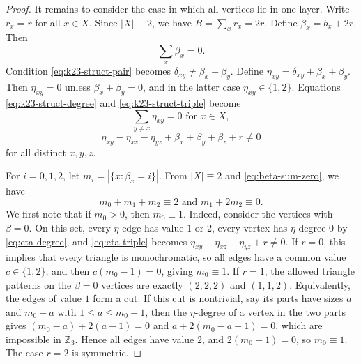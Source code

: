 \documentclass[10pt,a4paper]{amsart}
\newcommand{\Z}{\mathbb Z}
\begin{document}
\begin{proof}
    It remains to consider the case in which all vertices lie in one layer.  Write $r_x=r$ for all $x\in X$.  Since $|X|\equiv2$, we have $B=\sum_xr_x=2r$.  Define $\beta_x=b_x+2r$.  Then
    \begin{equation}\label{eq:beta-sum-zero}
        \sum_x\beta_x=0.
    \end{equation}
    Condition \eqref{eq:k23-struct-pair} becomes $\delta_{xy}\ne\beta_x+\beta_y$.  Define $\eta_{xy}=\delta_{xy}+\beta_x+\beta_y$.  Then $\eta_{xy}=0$ unless $\beta_x+\beta_y=0$, and in the latter case $\eta_{xy}\in\{1,2\}$.  Equations \eqref{eq:k23-struct-degree} and \eqref{eq:k23-struct-triple} become
    \begin{equation}\label{eq:eta-degree}
        \sum_{y\ne x}\eta_{xy}=0\text{ for }x\in X,
    \end{equation}
    \begin{equation}\label{eq:eta-triple}
        \eta_{xy}-\eta_{xz}-\eta_{yz}+\beta_x+\beta_y+\beta_z+r\ne0
    \end{equation}
    for all distinct $x,y,z$.

    For \(i=0,1,2\), let $m_i=|\{x:\beta_x=i\}|$.  From $|X|\equiv2$ and \eqref{eq:beta-sum-zero}, we have
    \begin{equation}\label{eq:mi-basic}
        m_0+m_1+m_2\equiv2\text{ and }m_1+2m_2\equiv0.
    \end{equation}
    We first note that if \(m_0>0\), then
    \(m_0\equiv 1.\)
    Indeed, consider the vertices with \(\beta=0\). On this set, every \(\eta\)-edge has value \(1\) or \(2\), every vertex has \(\eta\)-degree \(0\) by \eqref{eq:eta-degree}, and \eqref{eq:eta-triple} becomes
    \(\eta_{xy}-\eta_{xz}-\eta_{yz}+r\ne 0.\)
    If \(r=0\), this implies that every triangle is monochromatic, so all edges have a common value \(c\in\{1,2\}\), and then \(c(m_0-1)=0\), giving \(m_0\equiv 1\). If \(r=1\), the allowed triangle patterns on the \(\beta=0\) vertices are exactly \((2,2,2)\) and \((1,1,2)\). Equivalently, the edges of value \(1\) form a cut. If this cut is nontrivial, say its parts have sizes $a$ and $m_0-a$ with $1\le a\le m_0-1$, then the \(\eta\)-degree of a vertex in the two parts gives $(m_0-a)+2(a-1)=0$ and $a+2(m_0-a-1)=0$, which are impossible in $\Z_3$. Hence all edges have value \(2\), and \(2(m_0-1)=0\), so \(m_0\equiv 1\). The case \(r=2\) is symmetric.


\end{proof}
\end{document}
